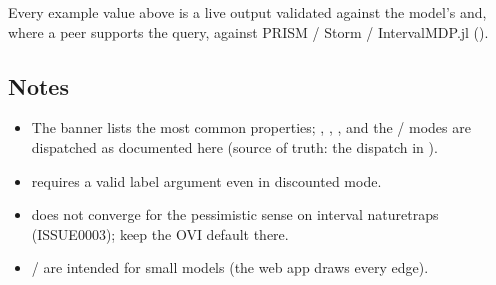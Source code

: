 \documentclass[a4paper,10pt,english]{sphinxmanual}
\begin{document}
\sphinxAtStartPar
Every example value above is a live output validated against the model’s 
and, where a peer supports the query, against PRISM / Storm / IntervalMDP.jl
().


\subsection{Notes}
\label{\detokenize{manual/cli:notes}}\begin{itemize}
\item {} 
\sphinxAtStartPar
The  banner lists the most common properties; , , , 
and the / modes are dispatched as documented here (source of truth:
the dispatch in ).

\item {} 
\sphinxAtStartPar
{} requires a valid label argument even in discounted mode.

\item {} 
\sphinxAtStartPar
{} does not converge for the pessimistic sense on interval nature\sphinxhyphen{}traps
(ISSUE\sphinxhyphen{}0003); keep the OVI default there.

\item {} 
\sphinxAtStartPar
{}/ are intended for small models (the web app draws every edge).

\end{itemize}

\sphinxstepscope
\end{document}
